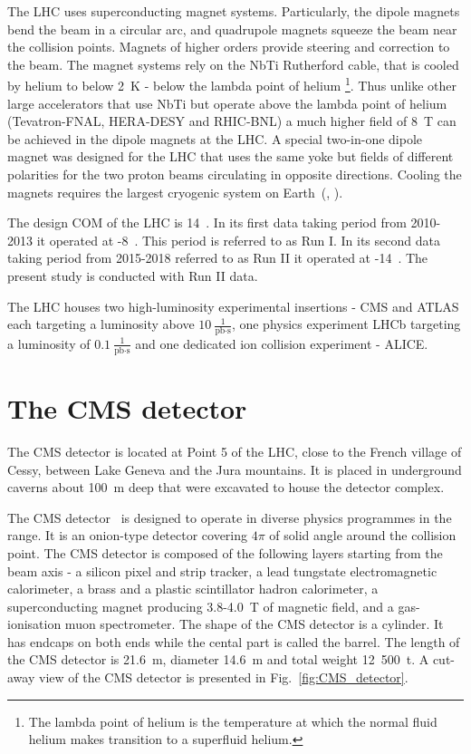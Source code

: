 The LHC uses superconducting magnet systems. Particularly, the dipole magnets bend the beam in a circular arc, and quadrupole magnets squeeze the beam near the collision points. Magnets of higher orders provide steering and correction to the beam. The magnet systems rely on the NbTi Rutherford cable, that is cooled by helium to below 2~K - below the lambda point of helium \footnote{The lambda point of helium is the temperature at which the normal fluid helium makes transition to a superfluid helium.}. Thus unlike other large accelerators that use NbTi but operate above the lambda point of helium (Tevatron-FNAL, HERA-DESY and RHIC-BNL) a much higher field of 8~T can be achieved in the dipole magnets at the LHC. A special two-in-one dipole magnet was designed for the LHC that uses the same yoke but fields of different polarities for the two proton beams circulating in opposite directions. Cooling the magnets requires the largest cryogenic system on Earth~(\cite{MYERS:2013hra}, \cite{Evans:2008zzb}).

The design COM of the LHC is 14~\TeV. In its first data taking period from 2010-2013 it operated at -8~\TeV. This period is referred to as Run I. In its second data taking period from 2015-2018 referred to as Run II it operated at -14~\TeV. The present study is conducted with Run II data.

The LHC houses two high-luminosity experimental insertions - CMS and ATLAS each targeting a luminosity above $10~{\frac{1}{\text{pb}\cdot\text{s}}}$, one \cPqb physics experiment LHCb targeting a luminosity of $0.1~\frac{1}{\text{pb}\cdot\text{s}}$ and one dedicated ion collision experiment - ALICE. 

\section{The CMS detector}

The CMS detector is located at Point 5 of the LHC, close to the French village of Cessy, between Lake Geneva and the Jura mountains. It is placed in underground caverns about 100~m deep that were excavated to house the detector complex.

The CMS detector~\cite{Chatrchyan:2008aa} is designed to operate in diverse physics programmes in the \TeV range. It is an onion-type detector covering $4\pi$ of solid angle around the collision point. The CMS detector is composed of the following layers starting from the beam axis - a silicon pixel and strip tracker, a lead tungstate electromagnetic calorimeter, a brass and a plastic scintillator hadron calorimeter, a superconducting magnet producing 3.8-4.0~T of magnetic field, and a gas-ionisation muon spectrometer. The shape of the CMS detector is a cylinder. It has endcaps on both ends while the cental part is called the barrel. The length of the CMS detector is 21.6~m, diameter 14.6~m and total weight 12~500~t. A cut-away view of the CMS detector is presented in Fig.~\ref{fig:CMS_detector}.

